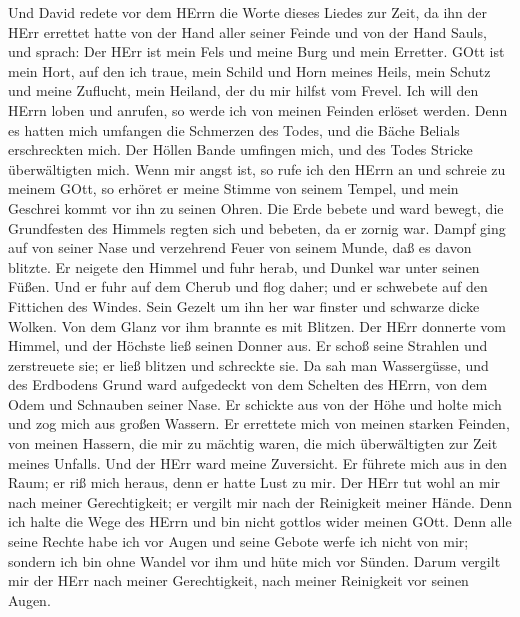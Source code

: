  Und David redete vor dem HErrn die Worte dieses Liedes zur
Zeit, da ihn der HErr errettet hatte von der Hand aller seiner Feinde
und von der Hand Sauls, und sprach:  Der HErr ist mein Fels
und meine Burg und mein Erretter.  GOtt ist mein Hort, auf
den ich traue, mein Schild und Horn meines Heils, mein Schutz und meine
Zuflucht, mein Heiland, der du mir hilfst vom Frevel.  Ich
will den HErrn loben und anrufen, so werde ich von meinen Feinden
erlöset werden.  Denn es hatten mich umfangen die Schmerzen
des Todes, und die Bäche Belials erschreckten mich.  Der
Höllen Bande umfingen mich, und des Todes Stricke überwältigten mich.
 Wenn mir angst ist, so rufe ich den HErrn an und schreie zu
meinem GOtt, so erhöret er meine Stimme von seinem Tempel, und mein
Geschrei kommt vor ihn zu seinen Ohren.  Die Erde bebete und
ward bewegt, die Grundfesten des Himmels regten sich und bebeten, da er
zornig war.  Dampf ging auf von seiner Nase und verzehrend
Feuer von seinem Munde, daß es davon blitzte.  Er neigete
den Himmel und fuhr herab, und Dunkel war unter seinen Füßen.
 Und er fuhr auf dem Cherub und flog daher; und er
schwebete auf den Fittichen des Windes.  Sein Gezelt um ihn
her war finster und schwarze dicke Wolken.  Von dem Glanz
vor ihm brannte es mit Blitzen.  Der HErr donnerte vom
Himmel, und der Höchste ließ seinen Donner aus.  Er schoß
seine Strahlen und zerstreuete sie; er ließ blitzen und schreckte sie.
 Da sah man Wassergüsse, und des Erdbodens Grund ward
aufgedeckt von dem Schelten des HErrn, von dem Odem und Schnauben seiner
Nase.  Er schickte aus von der Höhe und holte mich und zog
mich aus großen Wassern.  Er errettete mich von meinen
starken Feinden, von meinen Hassern, die mir zu mächtig waren,
 die mich überwältigten zur Zeit meines Unfalls. Und der
HErr ward meine Zuversicht.  Er führete mich aus in den
Raum; er riß mich heraus, denn er hatte Lust zu mir.  Der
HErr tut wohl an mir nach meiner Gerechtigkeit; er vergilt mir nach der
Reinigkeit meiner Hände.  Denn ich halte die Wege des HErrn
und bin nicht gottlos wider meinen GOtt.  Denn alle seine
Rechte habe ich vor Augen und seine Gebote werfe ich nicht von mir;
 sondern ich bin ohne Wandel vor ihm und hüte mich vor
Sünden.  Darum vergilt mir der HErr nach meiner
Gerechtigkeit, nach meiner Reinigkeit vor seinen Augen. 
